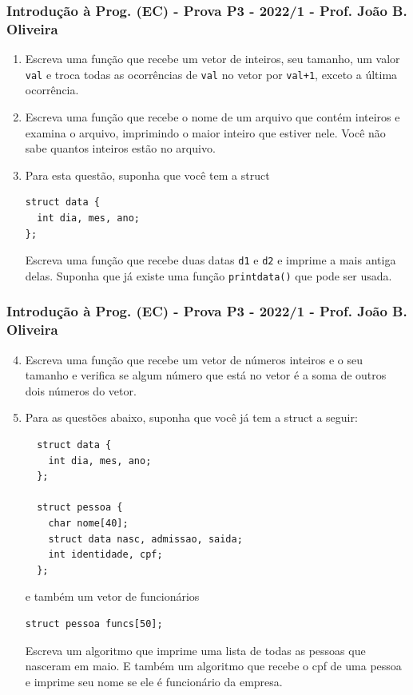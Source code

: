 \documentclass[aspectratio=169]{beamer}
\begin{document}
\begin{frame}[fragile]\frametitle{Introdução à Prog. (EC) - Prova P3 - 2022/1 - Prof. João B. Oliveira}

\begin{enumerate}
	\item Escreva uma função que recebe um vetor de inteiros, seu tamanho, um valor {\tt val} e troca todas as ocorrências de {\tt val} no vetor por {\tt val+1}, exceto a última ocorrência.
	\item Escreva uma função que recebe o nome de um arquivo que contém inteiros e examina o arquivo, imprimindo o maior inteiro que estiver nele. Você não sabe quantos inteiros estão no arquivo.
	\item Para esta questão, suponha que você tem a struct
{\scriptsize
\begin{lstlisting}
struct data {
  int dia, mes, ano;
};
\end{lstlisting}}
Escreva uma função que recebe duas datas {\tt d1} e {\tt d2} e imprime a mais antiga delas. Suponha que já existe uma função {\tt printdata()} que pode ser usada.
\end{enumerate}
\end{frame}

\begin{frame}[fragile]\frametitle{Introdução à Prog. (EC) - Prova P3 - 2022/1 - Prof. João B. Oliveira}
\begin{enumerate}
\setcounter{enumi}{3}
\item Escreva uma função que recebe um vetor de números inteiros e o seu tamanho e verifica se algum número que está no vetor é a soma de outros dois números do vetor. 
 \item Para as questões abaixo, suponha que você já tem a struct a seguir:
{\tiny
\begin{lstlisting}
  struct data {
    int dia, mes, ano;
  };

  struct pessoa {
    char nome[40];
    struct data nasc, admissao, saida;
    int identidade, cpf;
  };
\end{lstlisting}}
e também um vetor de funcionários
{\tiny
\begin{lstlisting}
struct pessoa funcs[50];
\end{lstlisting}}
Escreva um algoritmo que imprime uma lista de todas as pessoas que nasceram em maio. E também um algoritmo que recebe o cpf de uma pessoa e imprime seu nome se ele é funcionário da empresa.
\end{enumerate}
\end{frame}

\end{document}
